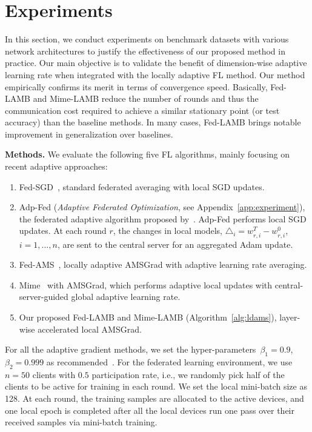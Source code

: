 \documentclass[nohyperref]{article}
\theoremstyle{plain}
\theoremstyle{definition}
\theoremstyle{remark}
\begin{document}
\section{Experiments}\label{sec:numerical}

In this section, we conduct experiments on benchmark datasets with various network architectures to justify the effectiveness of our proposed method in practice. Our main objective is to validate the benefit of dimension-wise adaptive learning rate when integrated with the locally adaptive FL method.
Our method empirically confirms its merit in terms of convergence speed.
Basically, Fed-LAMB and Mime-LAMB reduce the number of rounds and thus the communication cost required to achieve a similar stationary point (or test accuracy) than the baseline methods. 
In many cases, Fed-LAMB brings notable improvement in generalization over baselines.

\noindent\textbf{Methods.} We evaluate the following five FL algorithms, mainly focusing on recent adaptive approaches: 
\begin{enumerate}
    \item Fed-SGD~\citep{mcmahan2017communication}, standard federated averaging with local SGD updates.
    
    \item Adp-Fed (\emph{Adaptive Federated Optimization}, see Appendix~\ref{app:experiment}), the federated adaptive algorithm proposed by~\cite{reddi2020adaptive}. Adp-Fed performs local SGD updates. At each round $r$, the changes in local models, $\triangle_i=w_{r,i}^T-w_{r,i}^0$, $i=1,...,n$, are sent to the central server for an aggregated Adam update. 
    
    \item Fed-AMS~\citep{chen2020toward}, locally adaptive AMSGrad with adaptive learning rate averaging.
    
     \item Mime~\cite{karimireddy2020mime} with AMSGrad, which performs adaptive local updates with central-server-guided global adaptive learning rate.
    
    \item Our proposed Fed-LAMB and Mime-LAMB (Algorithm~\ref{alg:ldams}), layer-wise accelerated local AMSGrad.
\end{enumerate}
For all the adaptive gradient methods, we set the hyper-parameters~$\beta_1=0.9$,~$\beta_2=0.999$ as recommended~\citep{reddi2019convergence}. For the federated learning environment, we use $n=50$ clients with $0.5$ participation rate, i.e., we randomly pick half of the clients to be active for training in each round. 
We set the local mini-batch size as 128. At each round, the training samples are allocated to the active devices, and one local epoch is completed after all the local devices run one pass over their received samples via mini-batch training. 
\end{document}
